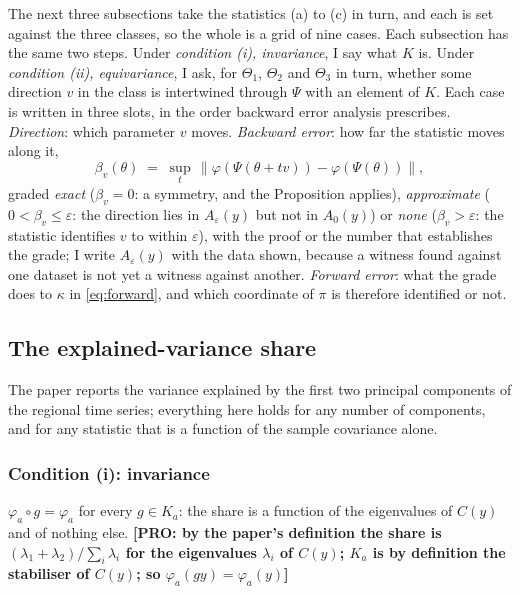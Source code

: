 \documentclass[11pt]{article}
\newcommand{\PRO}[1]{\textcolor{blue!55!black}{\textbf{[PRO: #1]}}}
\begin{document}
The next three subsections take the statistics (a) to (c) in turn, and each is set against the three classes, so the whole is a grid of nine cases. Each subsection has the same two steps. Under \emph{condition (i), invariance}, I say what $K$ is. Under \emph{condition (ii), equivariance}, I ask, for $\Theta_1$, $\Theta_2$ and $\Theta_3$ in turn, whether some direction $v$ in the class is intertwined through $\Psi$ with an element of $K$. Each case is written in three slots, in the order backward error analysis prescribes. \emph{Direction}: which parameter $v$ moves. \emph{Backward error}: how far the statistic moves along it,
\begin{equation}
\beta_v(\theta)\;=\;\sup_{t}\,\bigl\|\varphi(\Psi(\theta+tv))-\varphi(\Psi(\theta))\bigr\|,
\label{eq:betav}
\end{equation}
graded \emph{exact} ($\beta_v=0$: a symmetry, and the Proposition applies), \emph{approximate} ($0<\beta_v\le\varepsilon$: the direction lies in $A_\varepsilon(y)$ but not in $A_0(y)$) or \emph{none} ($\beta_v>\varepsilon$: the statistic identifies $v$ to within $\varepsilon$), with the proof or the number that establishes the grade; I write $A_\varepsilon(y)$ with the data shown, because a witness found against one dataset is not yet a witness against another. \emph{Forward error}: what the grade does to $\kappa$ in \eqref{eq:forward}, and which coordinate of $\pi$ is therefore identified or not.

\subsection{The explained-variance share}
The paper reports the variance explained by the first two principal components of the regional time series; everything here holds for any number of components, and for any statistic that is a function of the sample covariance alone.

\subsubsection{Condition (i): invariance}
$\varphi_a\circ g=\varphi_a$ for every $g\in K_a$: the share is a function of the eigenvalues of $C(y)$ and of nothing else. \PRO{by the paper's definition the share is $(\lambda_1+\lambda_2)/\sum_i\lambda_i$ for the eigenvalues $\lambda_i$ of $C(y)$; $K_a$ is by definition the stabiliser of $C(y)$; so $\varphi_a(gy)=\varphi_a(y)$}
\end{document}
